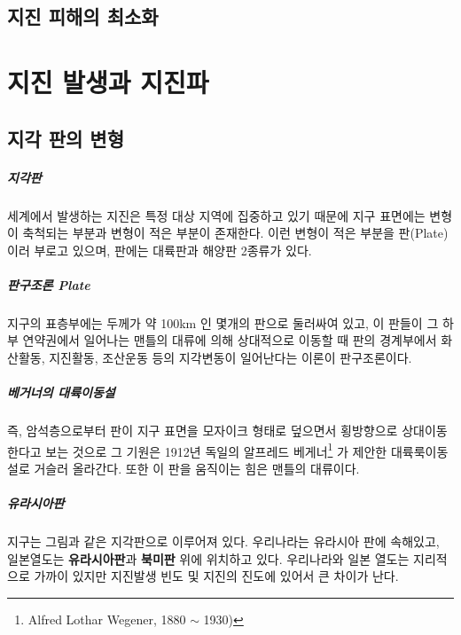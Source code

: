\documentclass[12pt, a4paper, oneside]{book}
\begin{document}
	\clearpage
	\section{지진 피해의 최소화}




	\clearpage
	\chapter{지진 발생과 지진파}


	\clearpage
	\section{지각 판의 변형}

		\paragraph{지각판} 
		세계에서 발생하는 지진은 특정 대상 지역에 집중하고 있기 때문에 지구 표면에는 변형이 축척되는 부분과 변형이 적은 부분이 존재한다.
		이런 변형이 적은 부분을 판(Plate)이러 부로고 있으며, 판에는 대륙판과 해양판 2종류가 있다.
		
		
		\paragraph{판구조론 Plate } 
		지구의 표층부에는 두께가 약 100km 인 몇개의 판으로 둘러싸여 있고, 
		이 판들이 그 하부 연약권에서 일어나는 맨틀의 대류에 의해 상대적으로 이동할 때 
		판의 경계부에서 화산활동, 지진활동, 조산운동 등의 지각변동이 일어난다는 이론이 판구조론이다. 
		
		\paragraph{베거너의 대륙이동설} 
		즉, 암석층으로부터 판이 지구 표면을 모자이크 형태로 덮으면서 횡방향으로 상대이동한다고 보는 것으로 
		그 기원은 1912년 독일의 알프레드 베게너\footnote{Alfred Lothar Wegener, 1880 $\sim$ 1930)} 가 제안한 대륙룩이동설로 거슬러 올라간다.
		또한 이 판을 움직이는 힘은 맨틀의 대류이다.
		
		\paragraph{유라시아판} 
		지구는 그림과 같은 지각판으로 이루어져 있다. 
		우리나라는 유라시아 판에 속해있고, 일본열도는 \textbf{유라시아판}과 \textbf{북미판} 위에 위치하고 있다.
		우리나라와 일본 열도는 지리적으로 가까이 있지만 지진발생 빈도 및 지진의 진도에 있어서 큰 차이가 난다.
		
\end{document}

